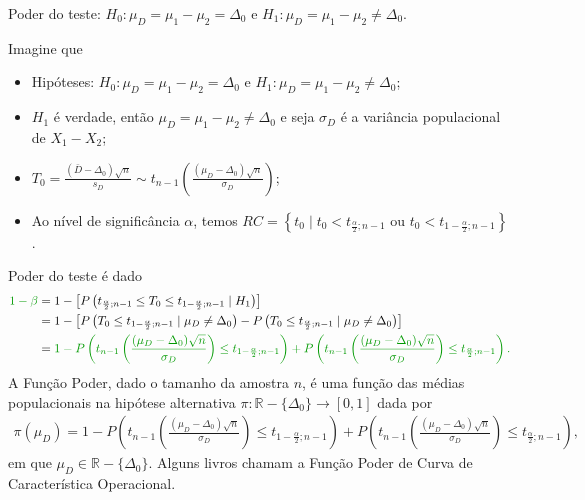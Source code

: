 \documentclass[9pt]{beamer}
\begin{document}
\begin{frame}{Poder do teste: $H_0:\mu_D = \mu_1 - \mu_2 = \Delta_0$ e $H_1:\mu_D =  \mu_1 - \mu_2 \neq \Delta_0$.}

\footnotesize

Imagine que
\begin{itemize}
	\item Hipóteses: $H_0:\mu_D= \mu_1 - \mu_2 = \Delta_0$ e $H_1:\mu_D= \mu_1 -  \mu_2 \neq \Delta_0$;
	\item $H_1$ é verdade, então $\mu_D = \mu_1-\mu_2 \neq \Delta_0$ e seja $\sigma_D$ é a variância populacional de $X_1 - X_2$;
	\item $T_0 = \frac{(\bar{D} - \Delta_0) \sqrt{n}}{s_D} \sim t_{n-1}\left( \frac{(\mu_D - \Delta_0)\sqrt{n}}{\sigma_D} \right)$;
	\item Ao nível de significância $\alpha$, temos $RC = \left\{ t_0 \mid t_0 < t_{\frac{\alpha}{2};n-1} \mbox{ ou } t_0 < t_{1-\frac{\alpha}{2}; n-1} \right\}$.
\end{itemize}
\vfill	

Poder do teste é dado
\begin{align*}
\textcolor{important}{1-\beta} &=1 - \left[P\left( t_{\frac{\alpha}{2};n-1} \leq T_0 \leq t_{1-\frac{\alpha}{2};n-1}  \mid H_1 \right)\right]\\
&= 1 - \left[P\left( T_0 \leq t_{1-\frac{\alpha}{2};n-1} \mid \mu_D \neq \Delta_0 \right) - P\left( T_0 \leq t_{\frac{\alpha}{2};n-1} \mid \mu_D \neq \Delta_0 \right) \right]\\ 
&= \textcolor{important}{1 - P\left( t_{n-1}\left( \frac{(\mu_D - \Delta_0)\sqrt{n}}{\sigma_D} \right) \leq t_{1-\frac{\alpha}{2};n-1} \right) + P\left( t_{n-1}\left( \frac{(\mu_D - \Delta_0)\sqrt{n}}{\sigma_D} \right) \leq t_{\frac{\alpha}{2};n-1} \right).}
\end{align*}
A \textcolor{important}{Função Poder}, dado o tamanho da amostra $n$, é uma função das médias populacionais na hipótese alternativa  $\pi: \mathbb{R} -\{\Delta_0\} \longrightarrow [0,1]$ dada por
\begin{align*}
\pi(\mu_D) = 1 - P\left( t_{n-1}\left( \frac{(\mu_D - \Delta_0)\sqrt{n}}{\sigma_D} \right) \leq t_{1-\frac{\alpha}{2};n-1} \right) + P\left( t_{n-1}\left( \frac{(\mu_D - \Delta_0)\sqrt{n}}{\sigma_D} \right) \leq t_{\frac{\alpha}{2};n-1} \right),
\end{align*}
em que $ \mu_D \in \mathbb{R} - \{\Delta_0\}.$ Alguns livros chamam a Função Poder de \textcolor{important}{Curva de Característica Operacional.}

\normalsize

\end{frame}
\end{document}
